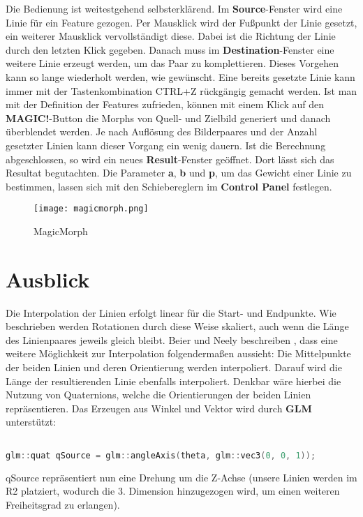 Die Bedienung ist weitestgehend selbsterklärend. Im \textbf{Source}-Fenster wird eine Linie für ein Feature gezogen. Per
Mausklick wird der Fu\ss punkt der Linie gesetzt, ein weiterer
Mausklick vervollständigt diese. Dabei ist die Richtung der Linie
durch den letzten Klick gegeben. Danach muss
im \textbf{Destination}-Fenster eine weitere Linie erzeugt werden, um das
Paar zu komplettieren. Dieses Vorgehen kann so lange wiederholt
werden, wie gewünscht. Eine bereits gesetzte Linie kann immer mit
der Tastenkombination CTRL+Z rückgängig gemacht werden.
Ist man mit der Definition der Features zufrieden, können mit einem
Klick auf den \textbf{MAGIC!}-Button die Morphs von Quell- und Zielbild
generiert und danach überblendet werden. Je nach Auflösung des Bilderpaares
und der Anzahl gesetzter Linien kann dieser Vorgang ein wenig
dauern. Ist die Berechnung abgeschlossen, so wird ein
neues \textbf{Result}-Fenster geöffnet. Dort lässt sich das
Resultat begutachten. Die Parameter \textbf{a}, \textbf{b} und
\textbf{p}, um das Gewicht einer Linie zu bestimmen, lassen
sich mit den Schiebereglern im \textbf{Control Panel} festlegen.

\begin{figure}[htb]
	\centering
	\texttt{[image: magicmorph.png]}
	\caption{MagicMorph}
	\label{fig:powermorph}
\end{figure}

\section{Ausblick}

Die Interpolation der Linien erfolgt linear für die Start-
und Endpunkte. Wie beschrieben werden Rotationen durch
diese Weise skaliert, auch wenn die Länge des Linienpaares
jeweils gleich bleibt. Beier und Neely beschreiben \cite{beierneely},
dass eine weitere Möglichkeit zur Interpolation folgenderma\ss en
aussieht:
Die Mittelpunkte der beiden Linien und deren Orientierung
werden interpoliert. Darauf wird die Länge der resultierenden
Linie ebenfalls interpoliert. Denkbar wäre hierbei die Nutzung
von Quaternions, welche die Orientierungen der beiden
Linien repräsentieren. Das Erzeugen aus Winkel
und Vektor wird durch \textbf{GLM} unterstützt:

\begin{lstlisting}[language=C++, caption=Quaternions in GLM, label=quaternion, xleftmargin=0.5cm]

glm::quat qSource = glm::angleAxis(theta, glm::vec3(0, 0, 1));
\end{lstlisting}
qSource repräsentiert nun eine Drehung um die Z-Achse
(unsere Linien werden im R2 platziert, wodurch die
3. Dimension hinzugezogen wird, um einen weiteren
Freiheitsgrad zu erlangen).

